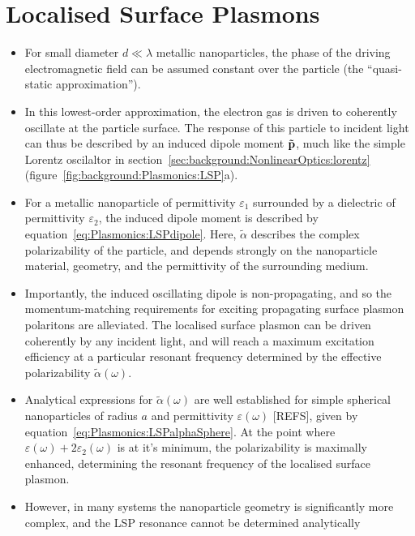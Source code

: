 \section{Localised Surface Plasmons}\label{sec:background:Plasmonics:Metamaterials}
\begin{itemize}
    \item For small diameter $d \ll \lambda$ metallic nanoparticles, the phase of the driving electromagnetic field can be assumed constant over the particle (the ``quasi-static approximation'').
    \item In this lowest-order approximation, the electron gas is driven to coherently oscillate at the particle surface. The response of this particle to incident light can thus be described by an induced dipole moment $\bf{\tilde p}$, much like the simple Lorentz oscilaltor in section~\ref{sec:background:NonlinearOptics:lorentz} (figure~\ref{fig:background:Plasmonics:LSP}a).
    \item For a metallic nanoparticle of permittivity $\varepsilon_1$ surrounded by a dielectric of permittivity $\varepsilon_2$, the induced dipole moment is described by equation~\ref{eq:Plasmonics:LSPdipole}. Here, ${\tilde \alpha }$ describes the complex polarizability of the particle, and depends strongly on the nanoparticle material, geometry, and the permittivity of the surrounding medium.
    \item Importantly, the induced oscillating dipole is non-propagating, and so the momentum-matching requirements for exciting propagating surface plasmon polaritons are alleviated. The localised surface plasmon can be driven coherently by any incident light, and will reach a maximum excitation efficiency at a particular resonant frequency determined by the effective polarizability ${\tilde \alpha }(\omega)$.
    \item Analytical expressions for ${\tilde \alpha }(\omega)$ are well established for simple spherical nanoparticles of radius $a$ and permittivity $\varepsilon(\omega)$ [REFS], given by equation~\ref{eq:Plasmonics:LSPalphaSphere}. At the point where $\varepsilon (\omega) + 2\varepsilon_2 (\omega)$ is at it's minimum, the polarizability is maximally enhanced, determining the resonant frequency of the localised surface plasmon.
    \item However, in many systems the nanoparticle geometry is significantly more complex, and the LSP resonance cannot be determined analytically
\end{itemize}

